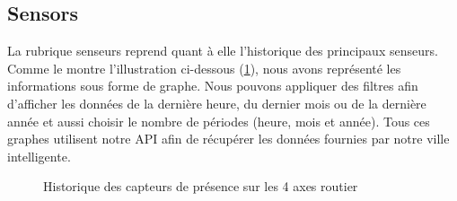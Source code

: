 \subsection{Sensors}
La rubrique senseurs reprend quant à elle l’historique des principaux senseurs. Comme le montre l’illustration ci-dessous (\ref{senseurs}), nous avons représenté les informations sous forme de graphe. Nous pouvons appliquer des filtres afin d’afficher les données de la dernière heure, du dernier mois ou de la dernière année et aussi choisir le nombre de périodes (heure, mois et année). Tous ces graphes utilisent notre API afin de récupérer les données fournies par notre ville intelligente.
\begin{figure}[H]
    \begin{center}
        \caption{Historique des capteurs de présence sur les 4 axes routier}\label{senseurs}
    \end{center}
\end{figure}

